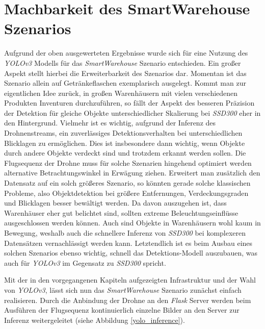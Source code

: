 \section{Machbarkeit des SmartWarehouse Szenarios}

Aufgrund der oben ausgewerteten Ergebnisse wurde sich für eine Nutzung des \textit{YOLOv3} Modells für das \textit{SmartWarehouse} Szenario entschieden. Ein großer Aspekt stellt hierbei die Erweiterbarkeit des Szenarios dar. Momentan ist das Szenario allein auf Getränkeflaschen exemplarisch ausgelegt. Kommt man zur eigentlichen Idee zurück, in großen Warenhäusern mit vielen verschiedenen Produkten Inventuren durchzuführen, so fällt der Aspekt des besseren Präzision der Detektion für gleiche Objekte unterschiedlicher Skalierung bei \textit{SSD300} eher in den Hintergrund. Vielmehr ist es wichtig, aufgrund der Inferenz des Drohnenstreams, ein zuverlässiges Detektionsverhalten bei unterschiedlichen Blicklagen zu ermöglichen. Dies ist insbesondere dann wichtig, wenn Objekte durch andere Objekte verdeckt sind und trotzdem erkannt werden sollen. Die Flugsequenz der Drohne muss für solche Szenarien hingehend optimiert werden alternative Betrachtungswinkel in Erwägung ziehen. Erweitert man zusätzlich den Datensatz auf ein solch größeres Szenario, so könnten gerade solche klassischen Probleme, also Objektdetektion bei größere Entfernungen, Verdeckungsgraden und Blicklagen besser bewältigt werden. Da davon auszugehen ist, dass Warenhäuser eher gut belichtet sind, sollten extreme Beleuchtungseinflüsse ausgeschlossen werden können. Auch sind Objekte in Warenhäusern wohl kaum in Bewegung, weshalb auch die schnellere Inferenz von \textit{SSD300} bei komplexeren Datensätzen vernachlässigt werden kann. Letztendlich ist es beim Ausbau eines solchen Szenarios ebenso wichtig, schnell das Detektions-Modell auszubauen, was auch für \textit{YOLOv3} im Gegensatz zu \textit{SSD300} spricht. 

Mit der in den vorgegangenen Kapiteln aufgezeigten Infrastruktur und der Wahl von \textit{YOLOv3}, lässt sich nun das \textit{SmartWarehouse} Szenario zunächst einfach realisieren. Durch die Anbindung der Drohne an den \textit{Flask} Server werden beim Ausführen der Flugsequenz kontinuierlich einzelne Bilder an den Server zur Inferenz weitergeleitet (siehe Abbildung \ref{yolo_inference}). 


